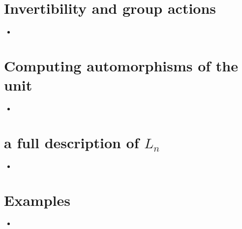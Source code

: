 \documentclass{amsart}
\begin{document}
\section{ Invertibility and group actions}
\begin{itemize}
\item 
\end{itemize}

\section{ Computing automorphisms of the unit}
\begin{itemize}
\item

\end{itemize}

\section{a full description of $L_n $}
\begin{itemize}
\item 
\end{itemize}
\section{ Examples}
\begin{itemize}
\item 
\end{itemize}
\end{document}
